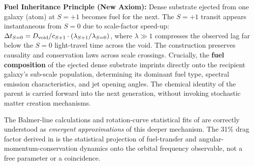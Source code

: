 \documentclass[11pt,letterpaper]{article}
\begin{document}
\begin{mdframed}
\textbf{Fuel Inheritance Principle (New Axiom):}
Dense substrate ejected from one galaxy (atom) at $S{=}+1$ becomes fuel for the
next. The $S{=}+1$ transit appears instantaneous from $S{=}0$ due to scale-factor
speed-up: $\Delta t_{S=0} = D_{\rm void}/c_{S+1} \cdot
(\lambda_{S+1}/\lambda_{S=0})$, where $\lambda \gg 1$ compresses the observed lag
far below the $S{=}0$ light-travel time across the void. The construction preserves
causality and conservation laws across scale crossings. Crucially, the \textbf{fuel
composition} of the ejected dense substrate imprints directly onto the recipient
galaxy's sub-scale population, determining its dominant fuel type, spectral emission
characteristics, and jet opening angles. The chemical identity of the parent is
carried forward into the next generation, without invoking stochastic matter
creation mechanisms.

The Balmer-line calculations and rotation-curve statistical fits of \cite{FSEP-I}
are correctly understood as \textit{emergent approximations} of this deeper
mechanism. The 31\% drag factor derived in \cite{FSEP-I} is the statistical
projection of fuel-transfer and angular-momentum-conservation dynamics onto the
orbital frequency observable, not a free parameter or a coincidence.
\end{mdframed}
\end{document}
